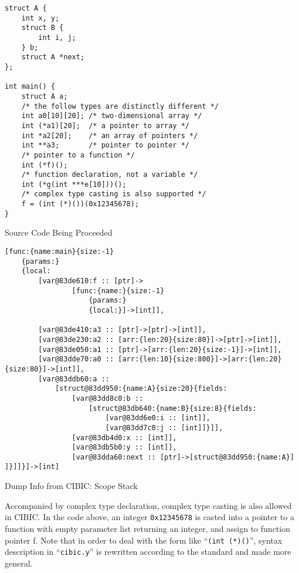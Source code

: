 \documentclass[10pt, a4paper]{article}
\begin{document}
\begin{listing}[H]
    \centering
    \begin{verbatim}
struct A {
    int x, y;
    struct B {
        int i, j;
    } b;
    struct A *next;
};

int main() {
    struct A a;
    /* the follow types are distinctly different */
    int a0[10][20]; /* two-dimensional array */
    int (*a1)[20];  /* a pointer to array */
    int *a2[20];    /* an array of pointers */
    int **a3;       /* pointer to pointer */
    /* pointer to a function */
    int (*f)();
    /* function declaration, not a variable */
    int (*g(int ***e[10]))();
    /* complex type casting is also supported */
    f = (int (*)())(0x12345678);
}
    \end{verbatim}
 \caption {Source Code Being Proceeded}
\end{listing}
\begin{listing}
    \centering
    \begin{BVerbatim}
[func:{name:main}{size:-1}
    {params:}
    {local:
        [var@83de610:f :: [ptr]->
                [func:{name:}{size:-1}
                    {params:}
                    {local:}]->[int]],

        [var@83de410:a3 :: [ptr]->[ptr]->[int]],
        [var@83de230:a2 :: [arr:{len:20}{size:80}]->[ptr]->[int]],
        [var@83de050:a1 :: [ptr]->[arr:{len:20}{size:-1}]->[int]],
        [var@83dde70:a0 :: [arr:{len:10}{size:800}]->[arr:{len:20}{size:80}]->[int]],
        [var@83ddb60:a ::
            [struct@83dd950:{name:A}{size:20}{fields:
                [var@83dd8c0:b ::
                    [struct@83db640:{name:B}{size:8}{fields:
                        [var@83dd6e0:i :: [int]],
                        [var@83dd7c0:j :: [int]]}]],
                [var@83db4d0:x :: [int]],
                [var@83db5b0:y :: [int]],
                [var@83dda60:next :: [ptr]->[struct@83dd950:{name:A}]
]}]]}]->[int]

    \end{BVerbatim}
    \caption {Dump Info from CIBIC: Scope Stack}
\end{listing}

Accompanied by complex type declaration, complex type casting is also allowed in
CIBIC. In the code above, an integer \texttt{0x12345678} is casted into a
pointer to a function with empty parameter list returning an integer, and assign
to function pointer f. Note that in order to deal with the form like
``\texttt{(int (*)()}'', syntax description in ``\texttt{cibic.y}'' is rewritten
according to the standard and made more general.
\end{document}
